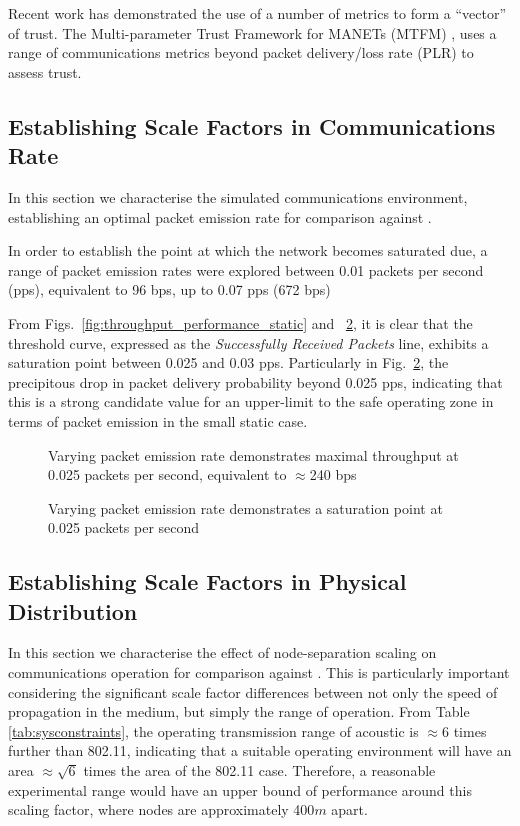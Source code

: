 Recent work has demonstrated the use of a number of metrics to form a ``vector'' of trust.
The Multi-parameter Trust Framework for MANETs (MTFM) \cite{Guo11}, uses a range of communications metrics beyond packet delivery/loss rate (PLR) to assess trust.

\subsection{Establishing Scale Factors in Communications Rate}

In this section we characterise the simulated communications environment, establishing an optimal packet emission rate for comparison against \cite{Guo11}.

In order to establish the point at which the network becomes saturated due, a range of packet emission rates were explored between 0.01 packets per second (pps), equivalent to 96 bps, up to 0.07 pps (672 bps)

From Figs.~\ref{fig:throughput_performance_static} and ~\ref{fig:prod_breakdown_static}, it is clear that the threshold curve, expressed as the \emph{Successfully Received Packets} line, exhibits a saturation point between 0.025 and 0.03 pps.
Particularly in Fig.~\ref{fig:prod_breakdown_static}, the precipitous drop in packet delivery probability beyond 0.025 pps, indicating that this is a strong candidate value for an upper-limit to the safe operating zone in terms of packet emission in the small static case.

\begin{figure}[H]
	\centering
	\caption{Varying packet emission rate demonstrates maximal throughput at 0.025 packets per second, equivalent to $\approx$240 bps}
	\label{fig:3d}
\end{figure}


\begin{figure}[H]
	\centering
	\caption{Varying packet emission rate demonstrates a saturation point at 0.025 packets per second}
	\label{fig:prod_breakdown_static}
\end{figure}



\subsection{Establishing Scale Factors in Physical Distribution}

In this section we characterise the effect of node-separation scaling on communications operation for comparison against \cite{Guo11}. This is particularly important considering the significant scale factor differences between not only the speed of propagation in the medium, but simply the range of operation. 
From Table \ref{tab:sysconstraints}, the operating transmission range of acoustic is $\approx 6$ times further than 802.11, indicating that a suitable operating environment will have an area $\approx \sqrt{6}$ times the area of the 802.11 case. Therefore, a reasonable experimental range would have an upper bound of performance around this scaling factor, where nodes are approximately 400$m$ apart. 

